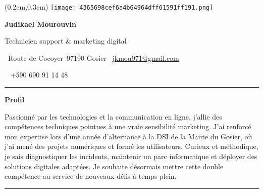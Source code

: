 \documentclass[a4paper]{article}
\newcommand{\fullrule}{\hspace{-1.5cm}\rule{\paperwidth}{0.4pt}}
\newcommand{\cvsection}[1]{%
  \vspace{6pt}\textbf{\Large #1}\par\vspace{2pt}}
\begin{document}
\color{white}
\begin{textblock*}{4cm}(0.2cm,0.3cm)
  \texttt{[image: 4365698cef6a4b64964dff61591ff191.png]}
\end{textblock*}

\begin{center}
  {\fontsize{44pt}{24pt}\selectfont\bfseries Judikael Mourouvin}

  \bigskip
  {\Large Technicien support \& marketing digital}

  \bigskip\bigskip
  \faMapMarker~Route de Cocoyer\ 97190 Gosier
  \quad\faEnvelope~\href{mailto:jkmou971@gmail.com}{jkmou971@gmail.com}

  \bigskip
  \faPhone~ +590 690 91 14 48
  \quad \faLinkedin\ \href{}{}
 

  \vspace{-0.3cm}
  \fullrule
\end{center}

\cvsection{Profil}
\hspace*{2.2cm}%
Passionné par les technologies et la communication en ligne, j’allie des compétences techniques pointues à une vraie sensibilité marketing. J’ai renforcé mon expertise lors d’une année d’alternance à la DSI de la Mairie du Gosier, où j’ai mené des projets numériques et formé les utilisateurs. Curieux et méthodique, je sais diagnostiquer les incidents, maintenir un parc informatique et déployer des solutions digitales adaptées. Je souhaite désormais mettre cette double compétence au service de nouveaux défis à temps plein.

\medskip\fullrule
\end{document}
